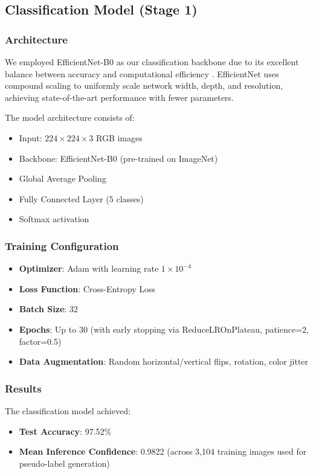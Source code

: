 \documentclass[10pt,a4paper]{article}
\begin{document}
\subsection{Classification Model (Stage 1)}

\subsubsection{Architecture}

We employed EfficientNet-B0 as our classification backbone due to its excellent balance between accuracy and computational efficiency \cite{tan2019efficientnet}. EfficientNet uses compound scaling to uniformly scale network width, depth, and resolution, achieving state-of-the-art performance with fewer parameters.

The model architecture consists of:
\begin{itemize}
\item Input: $224 \times 224 \times 3$ RGB images
\item Backbone: EfficientNet-B0 (pre-trained on ImageNet)
\item Global Average Pooling
\item Fully Connected Layer (5 classes)
\item Softmax activation
\end{itemize}

\subsubsection{Training Configuration}

\begin{itemize}
\item \textbf{Optimizer}: Adam with learning rate $1 \times 10^{-4}$
\item \textbf{Loss Function}: Cross-Entropy Loss
\item \textbf{Batch Size}: 32
\item \textbf{Epochs}: Up to 30 (with early stopping via ReduceLROnPlateau, patience=2, factor=0.5)
\item \textbf{Data Augmentation}: Random horizontal/vertical flips, rotation, color jitter
\end{itemize}

\subsubsection{Results}

The classification model achieved:
\begin{itemize}
\item \textbf{Test Accuracy}: 97.52\%
\item \textbf{Mean Inference Confidence}: 0.9822 (across 3,104 training images used for pseudo-label generation)
\end{itemize}
\end{document}
